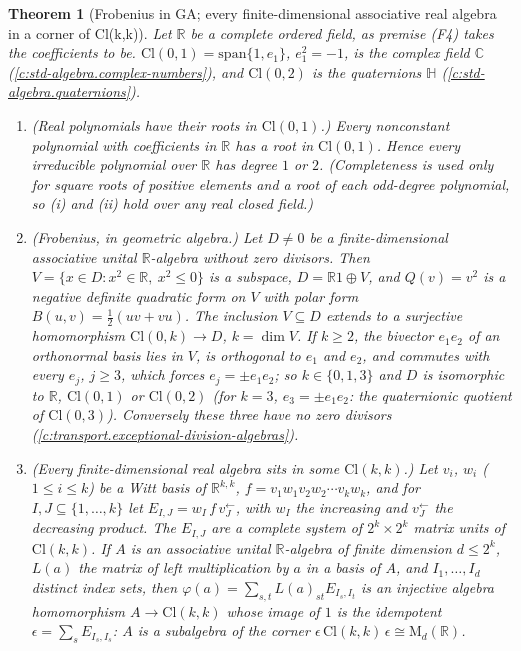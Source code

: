 \documentclass[11pt]{article}
\newtheorem{theorem}{Theorem}[section]
\theoremstyle{definition}
\theoremstyle{plain}
\newcommand{\changedmark}[2]{\marginpar{\raggedright\scriptsize\color{#1}#2}}
\providecommand{\C}{}\renewcommand{\C}{\mathbb{C}}
\providecommand{\Cl}{}\renewcommand{\Cl}{\mathrm{Cl}}
\providecommand{\HH}{}\renewcommand{\HH}{\mathbb{H}}
\providecommand{\Mat}{}\renewcommand{\Mat}{\mathrm{M}}
\providecommand{\R}{}\renewcommand{\R}{\mathbb{R}}
\begin{document}
\begin{theorem}[Frobenius in GA; every finite-dimensional associative real algebra in a corner of Cl(k,k)]\label{c:synthesis.frobenius-and-universality-in-clifford-algebras}
\changedmark{BurntOrange}{changed since the deposit}
Let $\R$ be a complete ordered field, as premise (F4) takes the coefficients to be. $\Cl(0,1) = \mathrm{span}\{1, e_{1}\}$, $e_{1}^{2} = -1$, is the complex field $\C$ (\ref{c:std-algebra.complex-numbers}), and $\Cl(0,2)$ is the quaternions $\HH$ (\ref{c:std-algebra.quaternions}).
\begin{enumerate}
\item[(i)] \emph{(Real polynomials have their roots in $\Cl(0,1)$.)} Every nonconstant polynomial with coefficients in $\R$ has a root in $\Cl(0,1)$. Hence every irreducible polynomial over $\R$ has degree $1$ or $2$. (Completeness is used only for square roots of positive elements and a root of each odd-degree polynomial, so (i) and (ii) hold over any real closed field.)
\item[(ii)] \emph{(Frobenius, in geometric algebra.)} Let $D \ne 0$ be a finite-dimensional associative unital $\R$-algebra without zero divisors. Then $V = \{x \in D : x^{2} \in \R,\ x^{2} \le 0\}$ is a subspace, $D = \R 1 \oplus V$, and $Q(v) = v^{2}$ is a negative definite quadratic form on $V$ with polar form $B(u, v) = \tfrac12(uv + vu)$. The inclusion $V \subseteq D$ extends to a surjective homomorphism $\Cl(0,k) \to D$, $k = \dim V$. If $k \ge 2$, the bivector $e_{1}e_{2}$ of an orthonormal basis lies in $V$, is orthogonal to $e_{1}$ and $e_{2}$, and commutes with every $e_{j}$, $j \ge 3$, which forces $e_{j} = \pm e_{1}e_{2}$; so $k \in \{0, 1, 3\}$ and $D$ is isomorphic to $\R$, $\Cl(0,1)$ or $\Cl(0,2)$ (for $k = 3$, $e_{3} = \pm e_{1}e_{2}$: the quaternionic quotient of $\Cl(0,3)$). Conversely these three have no zero divisors (\ref{c:transport.exceptional-division-algebras}).
\item[(iii)] \emph{(Every finite-dimensional real algebra sits in some $\Cl(k,k)$.)} Let $v_{i}$, $w_{i}$ ($1 \le i \le k$) be a Witt basis of $\R^{k,k}$, $f = v_{1}w_{1}v_{2}w_{2}\cdots v_{k}w_{k}$, and for $I, J \subseteq \{1, \dots, k\}$ let $E_{I,J} = w_{I}\,f\,v_{J}^{\leftarrow}$, with $w_{I}$ the increasing and $v_{J}^{\leftarrow}$ the decreasing product. The $E_{I,J}$ are a complete system of $2^{k} \times 2^{k}$ matrix units of $\Cl(k,k)$. If $A$ is an associative unital $\R$-algebra of finite dimension $d \le 2^{k}$, $L(a)$ the matrix of left multiplication by $a$ in a basis of $A$, and $I_{1}, \dots, I_{d}$ distinct index sets, then $\varphi(a) = \sum_{s,t}L(a)_{st}E_{I_{s},I_{t}}$ is an injective algebra homomorphism $A \to \Cl(k,k)$ whose image of $1$ is the idempotent $\epsilon = \sum_{s}E_{I_{s},I_{s}}$: $A$ is a subalgebra of the corner $\epsilon\,\Cl(k,k)\,\epsilon \cong \Mat_{d}(\R)$.

\end{enumerate}
\end{theorem}
\end{document}
